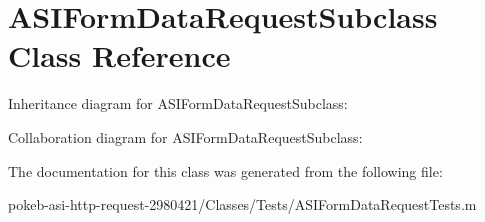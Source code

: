 \hypertarget{interface_a_s_i_form_data_request_subclass}{
\section{\-A\-S\-I\-Form\-Data\-Request\-Subclass \-Class \-Reference}
\label{interface_a_s_i_form_data_request_subclass}
}


\-Inheritance diagram for \-A\-S\-I\-Form\-Data\-Request\-Subclass\-:


\-Collaboration diagram for \-A\-S\-I\-Form\-Data\-Request\-Subclass\-:


\-The documentation for this class was generated from the following file\-:\begin{DoxyCompactItemize}
\item 
pokeb-\/asi-\/http-\/request-\/2980421/\-Classes/\-Tests/\-A\-S\-I\-Form\-Data\-Request\-Tests.\-m\end{DoxyCompactItemize}
